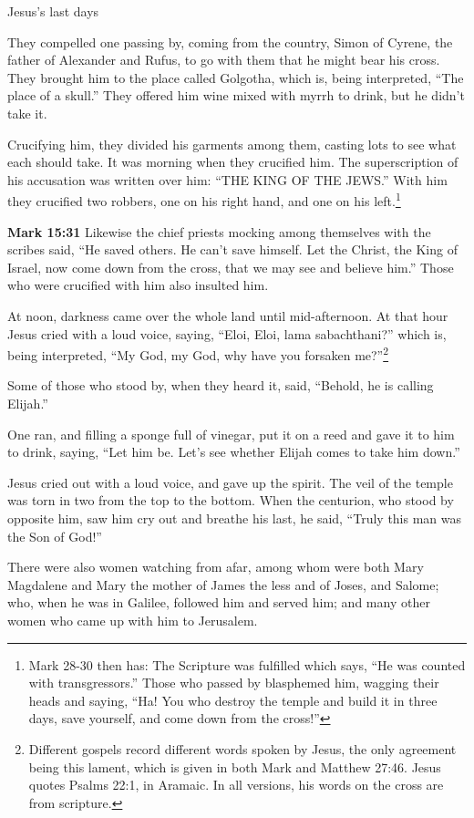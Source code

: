 \documentclass[10pt,twoside]{article} %
\newcommand{\quotesize}{\normalsize{}}
\newenvironment{quotetext}{\begingroup\quotesize}{\endgroup}
\newcommand{\bible}[2]{\begin{quotetext}\textbf{#1} #2\end{quotetext}}
\newcommand{\gospelmark}[2]{\bible{Mark #1}{#2}}
\begin{document}
\begin{section}{Jesus's last days}
{  They compelled one passing by, coming from the country, Simon of Cyrene, the father of Alexander and Rufus, to go with them that he might bear his cross.   They brought him to the place called Golgotha, which is, being interpreted, ``The place of a skull.''   They offered him wine mixed with myrrh to drink, but he didn't take it.

  Crucifying him, they divided his garments among them, casting lots to see what each should take.   
It was morning when they crucified him.   The superscription of his accusation was written over him: ``THE KING OF THE JEWS.''   With him they crucified two robbers, one on his right hand, and one on his left.\footnote{Mark 28-30 then has: The Scripture was fulfilled which says, 
``He was counted with transgressors.'' Those who passed by blasphemed him, wagging their heads and saying, ``Ha! You who destroy the temple and build it in three days,   save yourself, and come down from the cross!''}
}

\gospelmark{15:31}{
  Likewise the chief priests mocking among themselves with the scribes said, ``He saved others. He can't save himself.   Let the Christ, the King of Israel, now come down from the cross, that we may see and believe him.'' Those who were crucified with him also insulted him.

  At noon, darkness came over the whole land until mid-afternoon.   At that hour Jesus cried with a loud voice, saying, ``Eloi, Eloi, lama sabachthani?'' which is, being interpreted, ``My God, my God, why have
you forsaken me?''\footnote{Different gospels record different words spoken by Jesus, the only agreement being this lament, which is
given in both Mark and Matthew 27:46. Jesus quotes Psalms 22:1, in Aramaic. In all versions, his words on the cross are from scripture.}

  Some of those who stood by, when they heard it, said, ``Behold, he is calling Elijah.''

  One ran, and filling a sponge full of vinegar, put it on a reed and gave it to him to drink, saying, ``Let him be. Let's see whether Elijah comes to take him down.''

  Jesus cried out with a loud voice, and gave up the spirit.   The veil of the temple was torn in two from the top to the bottom.   
When the centurion, who stood by opposite him, saw him cry out and breathe his last, he said, ``Truly this man was the Son of God!''

  There were also women watching from afar, among whom were both Mary Magdalene and Mary the mother of James the less and of Joses, and Salome;   who, when he was in Galilee, followed him and served him; and many other women who came up with him to Jerusalem.
}


\end{section}
\end{document}
